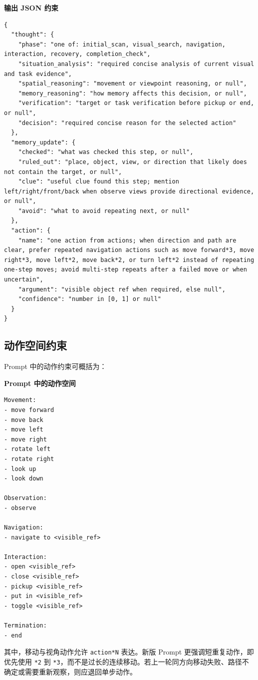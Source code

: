 \documentclass[UTF8,a4paper,12pt]{ctexart}
\begin{document}
\noindent\textbf{输出 JSON 约束}
\begin{lstlisting}
{
  "thought": {
    "phase": "one of: initial_scan, visual_search, navigation, interaction, recovery, completion_check",
    "situation_analysis": "required concise analysis of current visual and task evidence",
    "spatial_reasoning": "movement or viewpoint reasoning, or null",
    "memory_reasoning": "how memory affects this decision, or null",
    "verification": "target or task verification before pickup or end, or null",
    "decision": "required concise reason for the selected action"
  },
  "memory_update": {
    "checked": "what was checked this step, or null",
    "ruled_out": "place, object, view, or direction that likely does not contain the target, or null",
    "clue": "useful clue found this step; mention left/right/front/back when observe views provide directional evidence, or null",
    "avoid": "what to avoid repeating next, or null"
  },
  "action": {
    "name": "one action from actions; when direction and path are clear, prefer repeated navigation actions such as move forward*3, move right*3, move left*2, move back*2, or turn left*2 instead of repeating one-step moves; avoid multi-step repeats after a failed move or when uncertain",
    "argument": "visible object ref when required, else null",
    "confidence": "number in [0, 1] or null"
  }
}
\end{lstlisting}

\subsection{动作空间约束}

Prompt 中的动作约束可概括为：

\noindent\textbf{Prompt 中的动作空间}
\begin{lstlisting}
Movement:
- move forward
- move back
- move left
- move right
- rotate left
- rotate right
- look up
- look down

Observation:
- observe

Navigation:
- navigate to <visible_ref>

Interaction:
- open <visible_ref>
- close <visible_ref>
- pickup <visible_ref>
- put in <visible_ref>
- toggle <visible_ref>

Termination:
- end
\end{lstlisting}

其中，移动与视角动作允许 \texttt{action*N} 表达。新版 Prompt 更强调短重复动作，即优先使用 \texttt{*2} 到 \texttt{*3}，而不是过长的连续移动。若上一轮同方向移动失败、路径不确定或需要重新观察，则应退回单步动作。
\end{document}
